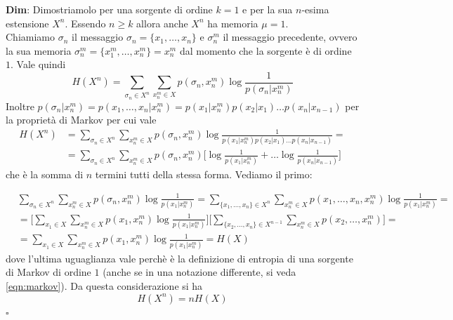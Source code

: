 \begin{tcolorbox}
\textbf{Dim}: Dimostriamolo per una sorgente di ordine $k=1$ e per la sua $n$-esima estensione $X^n$. Essendo $n\geq k$ allora anche $X^n$ ha memoria $\mu = 1$. \\
Chiamiamo $\sigma_n$ il messaggio $\sigma_n = \{x_1, \dots, x_n \}$ e $\sigma_n^m$ il messaggio precedente, ovvero la sua memoria $\sigma_n^m = \{x_{1}^m, \dots, x_{n}^m\} = x_{n}^m$ dal momento che la sorgente \`e di ordine $1$. Vale quindi
\begin{equation*}
    H(X^n) = \sum_{\sigma_n \in X^n} \sum_{x_{n}^m \in X} p(\sigma_n, x_{n}^m) \log \frac{1}{p(\sigma_n|x_{n}^m)}
\end{equation*}
Inoltre $p(\sigma_n| x_n^m) = p(x_1, \dots, x_n| x_n^m) = p(x_1|x_n^m) p(x_2|x_1) \dots p(x_n|x_{n-1})$ per la propriet\`a di Markov per cui vale
\begin{align*}
    H(X^n) &= \sum_{\sigma_n \in X^n} \sum_{x_{n}^m \in X} p(\sigma_n, x_{n}^m) \log \frac{1}{p(x_1|x_n^m) p(x_2|x_1) \dots p(x_n|x_{n-1})} = \\
    &= \sum_{\sigma_n \in X^n} \sum_{x_{n}^m \in X} p(\sigma_n, x_{n}^m) \bigg [ \log \frac{1}{p(x_1|x_n^m)} + \dots \log \frac{1}{p(x_n|x_{n-1})} \bigg ]
\end{align*}
che \`e la somma di $n$ termini tutti della stessa forma. Vediamo il primo:
\end{tcolorbox}
\begin{tcolorbox}
\begin{align*}
    &\sum_{\sigma_n \in X^n} \sum_{x_{n}^m \in X} p(\sigma_n, x_{n}^m) \log \frac{1}{p(x_1|x_n^m)} = \sum_{\{x_1, \dots, x_n\} \in X^{n}} \sum_{x_{n}^m \in X} p(x_1, \dots, x_n, x_{n}^m) \log \frac{1}{p(x_1|x_n^m)} = \\
    &= \Bigg [ \sum_{x_1 \in X} \sum_{x_n^m \in X} p(x_1, x_n^m) \log \frac{1}{p(x_1|x_n^m)} \Bigg ] \Bigg [ \sum_{\{x_2, \dots, x_n\} \in X^{n-1}} \sum_{x_n^m \in X} p(x_2, \dots, x_n^m) \Bigg ] = \\
    &=\sum_{x_1 \in X} \sum_{x_n^m \in X} p(x_1, x_n^m) \log \frac{1}{p(x_1|x_n^m)} = H(X)
\end{align*}
dove l'ultima uguaglianza vale perch\`e \`e la definizione di entropia di una sorgente di Markov di ordine $1$ (anche se in una notazione differente, si veda \ref{eqn:markov}). Da questa considerazione si ha
\begin{equation*}
    H(X^n) = nH(X)
\end{equation*}
$\square$
\end{tcolorbox}
